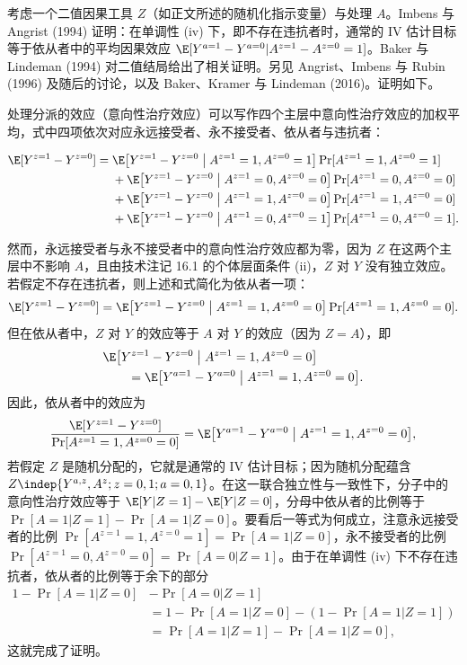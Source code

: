 \begin{techpoint}[单调性与依从者中的效应]
考虑一个二值因果工具 $Z$（如正文所述的随机化指示变量）与处理 $A$。Imbens 与 Angrist (1994) 证明：在单调性 (iv) 下，即不存在违抗者时，通常的 IV 估计目标等于依从者中的平均因果效应 $\E[Y^{a=1}-Y^{a=0}|A^{z=1}-A^{z=0}=1]$。Baker 与 Lindeman (1994) 对二值结局给出了相关证明。另见 Angrist、Imbens 与 Rubin (1996) 及随后的讨论，以及 Baker、Kramer 与 Lindeman (2016)。证明如下。

处理分派的效应（意向性治疗效应）可以写作四个主层中意向性治疗效应的加权平均，式中四项依次对应永远接受者、永不接受者、依从者与违抗者：
\begin{footnotesize}
\begin{align*}
\E[Y^{z=1}-Y^{z=0}] ={}& \E\bigl[Y^{z=1}-Y^{z=0}\bigm|A^{z=1}=1,A^{z=0}=1\bigr]\Pr[A^{z=1}=1,A^{z=0}=1]\\
&+\E\bigl[Y^{z=1}-Y^{z=0}\bigm|A^{z=1}=0,A^{z=0}=0\bigr]\Pr[A^{z=1}=0,A^{z=0}=0]\\
&+\E\bigl[Y^{z=1}-Y^{z=0}\bigm|A^{z=1}=1,A^{z=0}=0\bigr]\Pr[A^{z=1}=1,A^{z=0}=0]\\
&+\E\bigl[Y^{z=1}-Y^{z=0}\bigm|A^{z=1}=0,A^{z=0}=1\bigr]\Pr[A^{z=1}=0,A^{z=0}=1].
\end{align*}
\end{footnotesize}

然而，永远接受者与永不接受者中的意向性治疗效应都为零，因为 $Z$ 在这两个主层中不影响 $A$，且由技术注记 16.1 的个体层面条件 (ii)，$Z$ 对 $Y$ 没有独立效应。若假定不存在违抗者，则上述和式简化为依从者一项：
\[
\E[Y^{z=1}-Y^{z=0}]=\E\bigl[Y^{z=1}-Y^{z=0}\bigm|A^{z=1}=1,A^{z=0}=0\bigr]\Pr[A^{z=1}=1,A^{z=0}=0].
\]
但在依从者中，$Z$ 对 $Y$ 的效应等于 $A$ 对 $Y$ 的效应（因为 $Z=A$），即
\begin{align*}
&\E\bigl[Y^{z=1}-Y^{z=0}\bigm|A^{z=1}=1,A^{z=0}=0\bigr]\\
&\qquad=\E\bigl[Y^{a=1}-Y^{a=0}\bigm|A^{z=1}=1,A^{z=0}=0\bigr].
\end{align*}
因此，依从者中的效应为
\[
\frac{\E[Y^{z=1}-Y^{z=0}]}{\Pr[A^{z=1}=1,A^{z=0}=0]}=\E\bigl[Y^{a=1}-Y^{a=0}\bigm|A^{z=1}=1,A^{z=0}=0\bigr],
\]
若假定 $Z$ 是随机分配的，它就是通常的 IV 估计目标；因为随机分配蕴含 $Z\indep\{Y^{a,z},A^{z};z=0,1;a=0,1\}$。在这一联合独立性与一致性下，分子中的意向性治疗效应等于 $\E[Y|Z=1]-\E[Y|Z=0]$，分母中依从者的比例等于 $\Pr[A=1|Z=1]-\Pr[A=1|Z=0]$。要看后一等式为何成立，注意永远接受者的比例 $\Pr[A^{z=1}=1,A^{z=0}=1]=\Pr[A=1|Z=0]$，永不接受者的比例 $\Pr[A^{z=1}=0,A^{z=0}=0]=\Pr[A=0|Z=1]$。由于在单调性 (iv) 下不存在违抗者，依从者的比例等于余下的部分
\begin{align*}
1-\Pr[A=1|Z=0]&-\Pr[A=0|Z=1]\\
&=1-\Pr[A=1|Z=0]-(1-\Pr[A=1|Z=1])\\
&=\Pr[A=1|Z=1]-\Pr[A=1|Z=0],
\end{align*}
这就完成了证明。


\end{techpoint}

